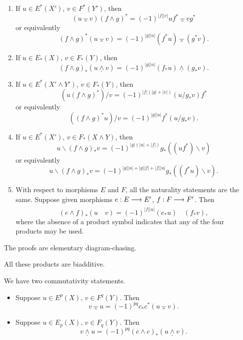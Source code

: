 \documentclass[../main]{subfiles}
\begin{document}
\begin{proposition}\label{prop:p3ch09.1}
\begin{enumerate}
    \item[(i)] If \(u \in E^\ast(X')\), \(v \in F^\ast(Y')\), then \[(u \barwedge v)(f \wedge g)^\ast = (-1)^{|f||v|} u f^\ast \barwedge v g^\ast\] or equivalently \[(f \wedge g)^\ast (u \barwedge v) = (-1)^{|g| |u|} (f^\ast u) \barwedge (g^\ast v).\]
    \item[(ii)] If \(u \in E_\ast(X)\), \(v \in F_\ast(Y)\), then \[(f \wedge g)_\ast(u \underline \wedge v) = (-1)^{|g| |u|} (f_\ast u) \underline \wedge (g_\ast v).\] 
    \item[(iii)] If \(u \in E^\ast(X' \wedge Y')\), \(v \in F_\ast(Y)\), then \[(u(f \wedge g)^\ast)/v = (-1)^{|f|(|g| + |v|)} (u/g_\ast v)f^\ast\] or equivalently \[((f \wedge g)^\ast u)/v = (-1)^{|g| |u|} f^\ast (u/g_\ast v).\]
    \item[(iv)] If \(u \in E^\ast(X')\), \(v \in F_\ast(X \wedge Y)\), then \[u \backslash (f \wedge g)_\ast v = (-1)^{|g|(|u| + |f|)} g_\ast((uf^\ast) \backslash v)\] or equivalently \[u \backslash (f \wedge g)_\ast v = (-1)^{|g| |u| + |g| |f| + |f| |u|} g_\ast((f^\ast u) \backslash v).\]
    \item[(v)] With respect to morphisms $E$ and $F$, all the naturality statements are the same. Suppose given morphisms $e : E \lar{} E'$, $f : F \lar{} F'$. Then \[(e \wedge f)_\ast (u \quad v) = (-1)^{|f| |u|} (e_\ast u) \quad (f_\ast v),\] where the absence of a product symbol indicates that any of the four products may be used. 
\end{enumerate}
\end{proposition}

The proofs are elementary diagram-chasing.

\begin{proposition}\label{prop:p3ch09.2}
All these products are biadditive.
\end{proposition}

We have two commutativity statements. 

\begin{proposition}\label{prop:p3ch09.3}
\begin{itemize}
    \item[(i)] Suppose \(u \in E^p(X)\), \(v \in F^q(Y)\). Then \[v \barwedge u = (-1)^{pq} c_\ast c^\ast(u \barwedge v).\]
    \item[(ii)] Suppose \(u \in E_p(X)\), \(v \in F_q(Y)\). Then \[v \underline \wedge u = (-1)^{pq} (c \wedge c)_\ast (u \underline \wedge v).\]
\end{itemize}
\end{proposition}
\end{document}
